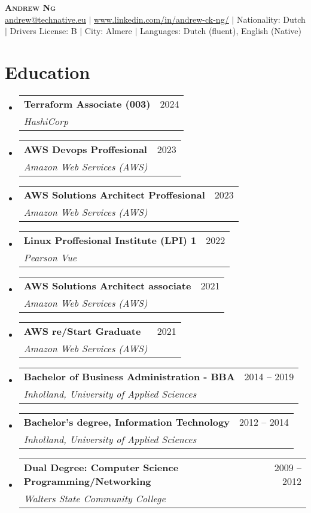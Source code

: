 \documentclass[letterpaper,11pt]{article}
\makeatletter
\newcommand{\resumeItem}[1]{
  \item\small{
    {#1 \vspace{-2pt}}
  }
}
\newcommand{\resumeSubheading}[4]{
  \vspace{-2pt}\item
    \begin{tabular*}{0.97\textwidth}[t]{l@{\extracolsep{\fill}}r}
      \textbf{#1} & #2 \\
      \textit{\small#3} & \textit{\small #4} \\
    \end{tabular*}\vspace{-7pt}
}
\newcommand{\resumeSubSubheading}[2]{
    \item
    \begin{tabular*}{0.97\textwidth}{l@{\extracolsep{\fill}}r}
      \textit{\small#1} & \textit{\small #2} \\
    \end{tabular*}\vspace{-7pt}
}
\newcommand{\resumeSubHeadingListStart}{\begin{itemize}[leftmargin=0.15in, label={}]}
\newcommand{\resumeSubHeadingListEnd}{\end{itemize}}
\newcommand{\resumeItemListStart}{\begin{itemize}}
\newcommand{\resumeItemListEnd}{\end{itemize}\vspace{-5pt}}
\makeatother
\begin{document}

\begin{center}
    \textbf{\Huge \scshape Andrew Ng} \\ \vspace{1pt}
    \href{mailto:x@x.com}{\underline{andrew@technative.eu}} $|$ 
    \href{https://linkedin.com/in/...}{\underline{www.linkedin.com/in/andrew-ck-ng/}} $|$
    \small Nationality: Dutch $|$ 
    {\small{Drivers License: B}} $|$  {\small{City: Almere}} $|$  
    {\small{Languages: Dutch (fluent), English (Native) }}
\end{center}

\section{Education}
  \resumeSubHeadingListStart
    \resumeSubheading
      {Terraform Associate (003)}{2024}
      {HashiCorp}{}
    \resumeSubheading
      {AWS Devops Proffesional}{2023}
      {Amazon Web Services (AWS)}{}
    \resumeSubheading
      {AWS Solutions Architect Proffesional}{2023}
      {Amazon Web Services (AWS)}{}
    \resumeSubheading
      {Linux Proffesional Institute (LPI) 1}{2022}
      {Pearson Vue}{}
    \resumeSubheading
      {AWS Solutions Architect associate}{2021}
      {Amazon Web Services (AWS)}{}
    \resumeSubheading
      {AWS re/Start Graduate}{2021}
      {Amazon Web Services (AWS)}{}
    \resumeSubheading
      {Bachelor of Business Administration - BBA}{2014 -- 2019}
      {Inholland, University of Applied Sciences}{}
    \resumeSubheading
      {Bachelor's degree, Information Technology}{2012 -- 2014}
      {Inholland, University of Applied Sciences}{}
    \resumeSubheading
      {Dual Degree: Computer Science Programming/Networking}{2009 -- 2012}
      {Walters State Community College}{}
  \resumeSubHeadingListEnd

\end{document}
